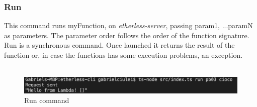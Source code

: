 


\subsubsection{Run}
This command runs myFunction, on \textit{etherless-server}, passing param1, ...paramN as parameters. The parameter order follows the order of the function signature. Run is a synchronous command. Once launched it returns the result of the function or, in case the functions has some execution problems, an exception.\\\\
\centerline{}
\begin{figure}
	\centering
	\includegraphics[width=\textwidth]{res/img/Screenshot_run.png}
	\caption{Run command}
\end{figure}
\\
\\

